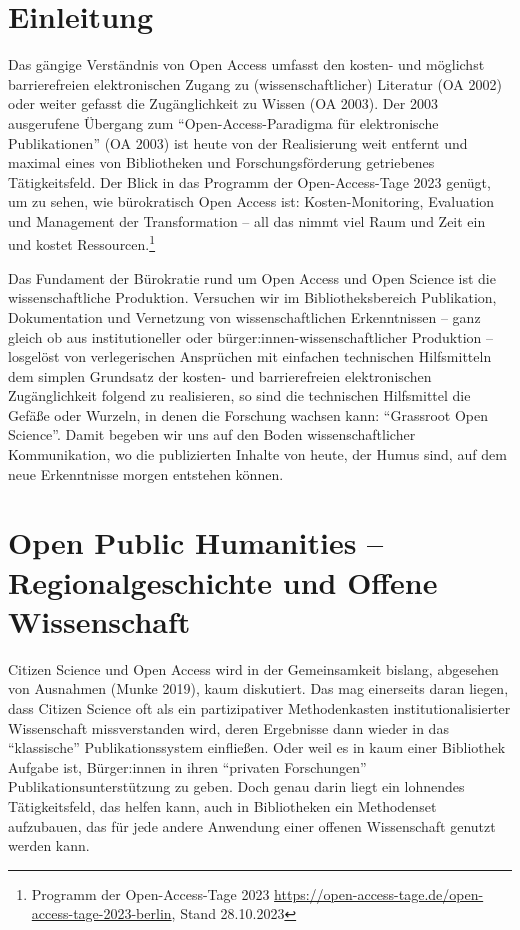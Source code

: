 \documentclass[a4paper,
fontsize=11pt,
oneside,
numbers=noperiodatend,
parskip=half-,
bibliography=totoc,
final
]{scrartcl}
\begin{document}
\hypertarget{einleitung}{%
\section{Einleitung}\label{einleitung}}

Das gängige Verständnis von Open Access umfasst den kosten- und
möglichst barrierefreien elektronischen Zugang zu (wissenschaftlicher)
Literatur (OA 2002) oder weiter gefasst die Zugänglichkeit zu Wissen (OA
2003). Der 2003 ausgerufene Übergang zum \enquote{Open-Access-Paradigma
für elektronische Publikationen} (OA 2003) ist heute von der
Realisierung weit entfernt und maximal eines von Bibliotheken und
Forschungsförderung getriebenes Tätigkeitsfeld. Der Blick in das
Programm der Open-Access-Tage 2023 genügt, um zu sehen, wie bürokratisch
Open Access ist: Kosten-Monitoring, Evaluation und Management der
Transformation -- all das nimmt viel Raum und Zeit ein und kostet
Ressourcen.\footnote{Programm der Open-Access-Tage 2023
  \url{https://open-access-tage.de/open-access-tage-2023-berlin}, Stand
  28.10.2023}

Das Fundament der Bürokratie rund um Open Access und Open Science ist
die wissenschaftliche Produktion. Versuchen wir im Bibliotheksbereich
Publikation, Dokumentation und Vernetzung von wissenschaftlichen
Erkenntnissen -- ganz gleich ob aus institutioneller oder
bürger:innen-wissenschaftlicher Produktion -- losgelöst von
verlegerischen Ansprüchen mit einfachen technischen Hilfsmitteln dem
simplen Grundsatz der kosten- und barrierefreien elektronischen
Zugänglichkeit folgend zu realisieren, so sind die technischen
Hilfsmittel die Gefäße oder Wurzeln, in denen die Forschung wachsen
kann: \enquote{Grassroot Open Science}. Damit begeben wir uns auf den
Boden wissenschaftlicher Kommunikation, wo die publizierten Inhalte von
heute, der Humus sind, auf dem neue Erkenntnisse morgen entstehen
können.

\hypertarget{open-public-humanities-regionalgeschichte-und-offene-wissenschaft}{%
\section{Open Public Humanities -- Regionalgeschichte und Offene
Wissenschaft}\label{open-public-humanities-regionalgeschichte-und-offene-wissenschaft}}

Citizen Science und Open Access wird in der Gemeinsamkeit bislang,
abgesehen von Ausnahmen (Munke 2019), kaum diskutiert. Das mag
einerseits daran liegen, dass Citizen Science oft als ein partizipativer
Methodenkasten institutionalisierter Wissenschaft missverstanden wird,
deren Ergebnisse dann wieder in das \enquote{klassische}
Publikationssystem einfließen. Oder weil es in kaum einer Bibliothek
Aufgabe ist, Bürger:innen in ihren \enquote{privaten Forschungen}
Publikationsunterstützung zu geben. Doch genau darin liegt ein lohnendes
Tätigkeitsfeld, das helfen kann, auch in Bibliotheken ein Methodenset
aufzubauen, das für jede andere Anwendung einer offenen Wissenschaft
genutzt werden kann.
\end{document}
